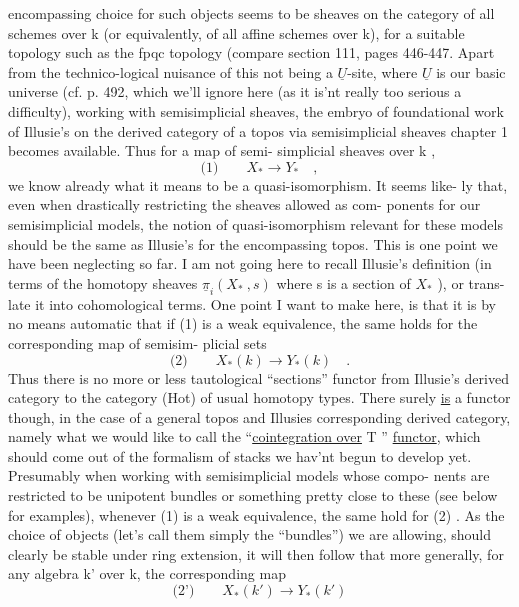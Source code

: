 
encompassing choice for such objects seems to be sheaves on the category
of all schemes  over k (or equivalently,  of all affine schemes over
k),  for a suitable topology such as the fpqc topology  (compare section
111,  pages 446-447\hand{)}.  Apart from the technico-logical nuisance of this
not being a $\underline{U}$-site,  where $\underline{U}$ is our basic universe  (cf. p. 492\hand{)},
which we'll ignore here (as it is'nt really too serious a difficulty),
 working with semisimplicial sheaves,  the embryo of foundational work
of Illusie's on the derived category of a topos via semisimplicial
sheaves\hand{[}  chapter 1\hand{]} becomes available.  Thus for a map of semi-
simplicial sheaves over k ,
\[
\text{(1)}\qquad X_{*} \longrightarrow Y_{*} \quad ,
\]
we know already what it means to be a quasi-isomorphism. It seems like-
ly that,  even when drastically restricting the sheaves allowed as com-
ponents for our semisimplicial models,  the notion of quasi-isomorphism
relevant for these models should be the same as Illusie's\xout{\unsure{,}}  for the
encompassing topos.  This is one point we have been neglecting so far.
I am not going here to recall Illusie's definition (in terms of the
homotopy sheaves  $\underline{\pi}_{i}(X_{*}\ , s)$  where s is a section of $X_{*}$ ),  or trans-
late it into cohomological terms.   One point I want to make here,  is
that it is by no means automatic  that  if (1) is a 
weak equivalence,  the same holds for the corresponding map of semisim-
plicial sets
\[
\text{(2)}\qquad X_{*}(k) \longrightarrow Y_{*}(k) \quad .
\]
Thus there is no  more or less tautological ``sections'' functor from
Illusie's derived category\xout{\unsure{,}} to the category (Hot) of usual homotopy
types. \hand{(}There surely \uline{is}  a  functor though,  in the case of a general
topos  and Illusies corresponding derived category,  namely what we would
like to call the ``\uline{cointegration over} T ''  \uline{functor},  which should come
out of the formalism of stacks we hav'nt  begun to  develop yet.\hand{)}
Presumably\hand{,}  when working with  semisimplicial models whose compo-
nents are restricted  to be unipotent bundles or something pretty close
to these (see below for examples),  whenever (1) is a weak equivalence,
the same  hold for (2) .  As the choice of objects (let's call them
simply the ``bundles'') we are allowing,  should clearly be stable under
ring extension,  it will then follow that more generally,  for any
algebra k' over k,  the corresponding map
\[
\text{(2')}\qquad X_{*}(k') \longrightarrow Y_{*}(k')
\]

